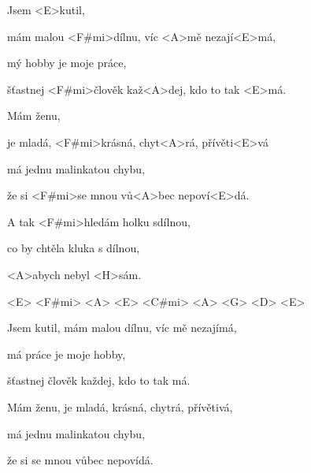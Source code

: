 

\zs
Jsem <E>kutil,

mám malou <F#mi>dílnu, víc <A>mě nezají<E>má,

mý hobby je moje práce,

šťastnej <F#mi>člověk kaž<A>dej, kdo to tak <E>má.

Mám ženu,

je mladá, <F#mi>krásná, chyt<A>rá, přívěti<E>vá

má jednu malinkatou chybu,

že si <F#mi>se mnou vů<A>bec nepoví<E>dá.
\ks

\zr
A tak <F#mi>hledám holku sdílnou,

co by chtěla kluka s dílnou,

<A>abych nebyl <H>sám.

<E> <F#mi> <A> <E> <C#mi> <A> <G> <D> <E>
\kr

\zs
Jsem kutil, mám malou dílnu, víc mě nezajímá,

má práce je moje hobby,

šťastnej člověk každej, kdo to tak má.

Mám ženu, je mladá, krásná, chytrá, přívětivá,

má jednu malinkatou chybu,

že si se mnou vůbec nepovídá.
\ks

\zr
\kr

\kp
